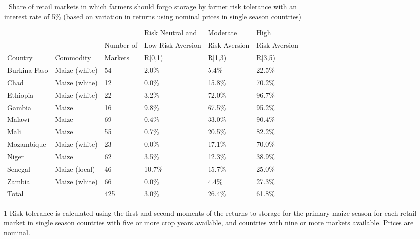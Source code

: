 \begin{table}[ht]
	\begin{threeparttable}[t]
		\centering
		\caption{Share of retail markets in which farmers should forgo storage by farmer risk tolerance with an interest rate of 5\% (based on variation in returns using nominal prices in single season countries) }
		\label{tab:risk_return_i}
		\begin{tabular}{|lll|lll|}
			\hline 
			&  & & Risk Neutral and & Moderate & High \\ 
			& & Number of  & Low Risk Aversion & Risk Aversion &  Risk Aversion\\ 
			Country&Commodity & Markets& R\in[0,1) &  R\in[1,3) & R\in[3,5) \\
			\hline
Burkina Faso & Maize (white) & 54 & 2.0\% & 5.4\% & 22.5\% \\ 
  Chad & Maize (white) & 12 & 0.0\% & 15.8\% & 70.2\% \\ 
  Ethiopia & Maize (white) & 22 & 3.2\% & 72.0\% & 96.7\% \\ 
  Gambia & Maize & 16 & 9.8\% & 67.5\% & 95.2\% \\ 
  Malawi & Maize & 69 & 0.4\% & 33.0\% & 90.4\% \\ 
  Mali & Maize & 55 & 0.7\% & 20.5\% & 82.2\% \\ 
  Mozambique & Maize (white) & 23 & 0.0\% & 17.1\% & 70.0\% \\ 
  Niger & Maize & 62 & 3.5\% & 12.3\% & 38.9\% \\ 
  Senegal & Maize (local) & 46 & 10.7\% & 15.7\% & 25.0\% \\ 
  Zambia & Maize (white) & 66 & 0.0\% & 4.4\% & 27.3\% \\ 
  \hline
  Total &  & 425 & 3.0\% & 26.4\% & 61.8\% \\ 
    \hline 
\end{tabular}
\begin{tablenotes}
\item [1] \footnotesize Risk tolerance is calculated using the first and second moments of the returns to storage for the primary maize season for each retail market in single season countries with five or more crop years available, and countries with nine or more markets available. Prices are nominal.
\end{tablenotes}
\end{threeparttable}
\end{table}
